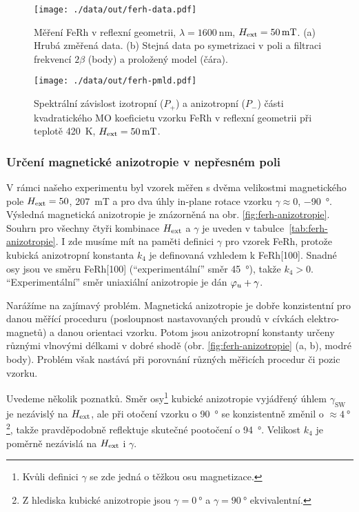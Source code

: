 \begin{figure}[htbp]
    \centering
    \texttt{[image: ./data/out/ferh-data.pdf]}
    \caption{Měření FeRh v reflexní geometrii, $\lambda=\SI{1600}{\nano\meter}$, $H_\textrm{ext}=\SI{50}{\milli\tesla}$. (a) Hrubá změřená data. (b) Stejná data po symetrizaci v poli a filtraci frekvencí $2\beta$ (body) a proložený model (čára).}
    \label{fig:ferh-fm-schema-data}
\end{figure}

\begin{figure}[htbp]
    \centering
    \texttt{[image: ./data/out/ferh-pmld.pdf]}
    \caption{Spektrální závislost izotropní ($P_+$) a anizotropní ($P_-$) části kvadratického MO koeficietu vzorku FeRh v reflexní geometrii při teplotě \SI{420}{\kelvin}, $H_\textrm{ext}=\SI{50}{\milli\tesla}$.}
    \label{fig:ferh-fm-pmld}
\end{figure}

\subsubsection*{Určení magnetické anizotropie v nepřesném poli}

V rámci našeho experimentu byl vzorek měřen s dvěma velikostmi magnetického pole $H_\textrm{ext}=50$, \SI{207}{\milli\tesla} a pro dva úhly in-plane rotace vzorku $\gamma\approx0$, \SI{-90}{\degree}.
Výsledná magnetická anizotropie je znázorněná na obr. \ref{fig:ferh-anizotropie}.
Souhrn pro všechny čtyři kombinace $H_\textrm{ext}$ a $\gamma$ je uveden v tabulce~\ref{tab:ferh-anizotropie}.
I zde musíme mít na paměti definici $\gamma$ pro vzorek FeRh, protože kubická anizotropní konstanta $k_4$ je definovaná vzhledem k FeRh[100].
Snadné osy jsou ve směru FeRh[100] (``experimentální'' směr \SI{45}{\degree}), takže $k_4>0$.
``Experimentální'' směr uniaxiální anizotropie je dán $\varphi_u+\gamma$.

Narážíme na zajímavý problém.
Magnetická anizotropie je dobře konzistentní pro danou měřící proceduru (posloupnost nastavovaných proudů v cívkách elektro-magnetů) a danou orientaci vzorku.
Potom jsou anizotropní konstanty určeny různými vlnovými délkami v dobré shodě (obr. \ref{fig:ferh-anizotropie} (a, b), modré body).
Problém však nastává při porovnání různých měřicích procedur či pozic vzorku.

Uvedeme několik poznatků.
Směr osy\footnote{Kvůli definici $\gamma$ se zde jedná o těžkou osu magnetizace.} kubické anizotropie vyjádřený úhlem $\gamma_\textrm{SW}$ je nezávislý na $H_\textrm{ext}$, ale při otočení vzorku o \SI{90}{\degree} se konzistentně změnil o $\approx\SI{4}{\degree}$\footnote{Z hlediska kubické anizotropie jsou $\gamma=\SI{0}{\degree}$ a $\gamma=\SI{90}{\degree}$ ekvivalentní.}, takže pravděpodobně reflektuje skutečné pootočení o \SI{94}{\degree}.
Velikost $k_4$ je poměrně nezávislá na $H_\textrm{ext}$ i $\gamma$.

